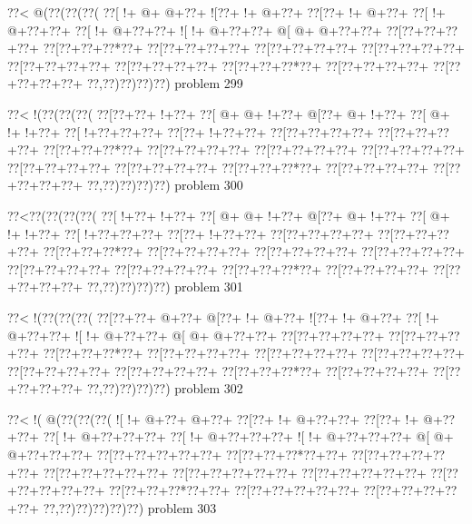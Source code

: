 \vbox{\vbox{\goo
\0??<\- @(\0??(\0??(\0??(
\0??[\- !+\- @+\- @+\0??+
\- ![\0??+\- !+\- @+\0??+
\0??[\0??+\- !+\- @+\0??+
\0??[\- !+\- @+\0??+\0??+
\0??[\- !+\- @+\0??+\0??+
\- ![\- !+\- @+\0??+\0??+
\- @[\- @+\- @+\0??+\0??+
\0??[\0??+\0??+\0??+\0??+
\0??[\0??+\0??+\0??*\0??+
\0??[\0??+\0??+\0??+\0??+
\0??[\0??+\0??+\0??+\0??+
\0??[\0??+\0??+\0??+\0??+
\0??[\0??+\0??+\0??+\0??+
\0??[\0??+\0??+\0??+\0??+
\0??[\0??+\0??+\0??*\0??+
\0??[\0??+\0??+\0??+\0??+
\0??[\0??+\0??+\0??+\0??+
\0??,\0??)\0??)\0??)\0??)
}
\hfil problem 299\hfil\break
}

\vbox{\vbox{\goo
\0??<\- !(\0??(\0??(\0??(
\0??[\0??+\0??+\- !+\0??+
\0??[\- @+\- @+\- !+\0??+
\- @[\0??+\- @+\- !+\0??+
\0??[\- @+\- !+\- !+\0??+
\0??[\- !+\0??+\0??+\0??+
\0??[\0??+\- !+\0??+\0??+
\0??[\0??+\0??+\0??+\0??+
\0??[\0??+\0??+\0??+\0??+
\0??[\0??+\0??+\0??*\0??+
\0??[\0??+\0??+\0??+\0??+
\0??[\0??+\0??+\0??+\0??+
\0??[\0??+\0??+\0??+\0??+
\0??[\0??+\0??+\0??+\0??+
\0??[\0??+\0??+\0??+\0??+
\0??[\0??+\0??+\0??*\0??+
\0??[\0??+\0??+\0??+\0??+
\0??[\0??+\0??+\0??+\0??+
\0??,\0??)\0??)\0??)\0??)
}
\hfil problem 300\hfil\break
}

\vbox{\vbox{\goo
\0??<\0??(\0??(\0??(\0??(
\0??[\- !+\0??+\- !+\0??+
\0??[\- @+\- @+\- !+\0??+
\- @[\0??+\- @+\- !+\0??+
\0??[\- @+\- !+\- !+\0??+
\0??[\- !+\0??+\0??+\0??+
\0??[\0??+\- !+\0??+\0??+
\0??[\0??+\0??+\0??+\0??+
\0??[\0??+\0??+\0??+\0??+
\0??[\0??+\0??+\0??*\0??+
\0??[\0??+\0??+\0??+\0??+
\0??[\0??+\0??+\0??+\0??+
\0??[\0??+\0??+\0??+\0??+
\0??[\0??+\0??+\0??+\0??+
\0??[\0??+\0??+\0??+\0??+
\0??[\0??+\0??+\0??*\0??+
\0??[\0??+\0??+\0??+\0??+
\0??[\0??+\0??+\0??+\0??+
\0??,\0??)\0??)\0??)\0??)
}
\hfil problem 301\hfil\break
}

\vbox{\vbox{\goo
\0??<\- !(\0??(\0??(\0??(
\0??[\0??+\0??+\- @+\0??+
\- @[\0??+\- !+\- @+\0??+
\- ![\0??+\- !+\- @+\0??+
\0??[\- !+\- @+\0??+\0??+
\- ![\- !+\- @+\0??+\0??+
\- @[\- @+\- @+\0??+\0??+
\0??[\0??+\0??+\0??+\0??+
\0??[\0??+\0??+\0??+\0??+
\0??[\0??+\0??+\0??*\0??+
\0??[\0??+\0??+\0??+\0??+
\0??[\0??+\0??+\0??+\0??+
\0??[\0??+\0??+\0??+\0??+
\0??[\0??+\0??+\0??+\0??+
\0??[\0??+\0??+\0??+\0??+
\0??[\0??+\0??+\0??*\0??+
\0??[\0??+\0??+\0??+\0??+
\0??[\0??+\0??+\0??+\0??+
\0??,\0??)\0??)\0??)\0??)
}
\hfil problem 302\hfil\break
}

\vbox{\vbox{\goo
\0??<\- !(\- @(\0??(\0??(\0??(
\- ![\- !+\- @+\0??+\- @+\0??+
\0??[\0??+\- !+\- @+\0??+\0??+
\0??[\0??+\- !+\- @+\0??+\0??+
\0??[\- !+\- @+\0??+\0??+\0??+
\0??[\- !+\- @+\0??+\0??+\0??+
\- ![\- !+\- @+\0??+\0??+\0??+
\- @[\- @+\- @+\0??+\0??+\0??+
\0??[\0??+\0??+\0??+\0??+\0??+
\0??[\0??+\0??+\0??*\0??+\0??+
\0??[\0??+\0??+\0??+\0??+\0??+
\0??[\0??+\0??+\0??+\0??+\0??+
\0??[\0??+\0??+\0??+\0??+\0??+
\0??[\0??+\0??+\0??+\0??+\0??+
\0??[\0??+\0??+\0??+\0??+\0??+
\0??[\0??+\0??+\0??*\0??+\0??+
\0??[\0??+\0??+\0??+\0??+\0??+
\0??[\0??+\0??+\0??+\0??+\0??+
\0??,\0??)\0??)\0??)\0??)\0??)
}
\hfil problem 303\hfil\break
}

